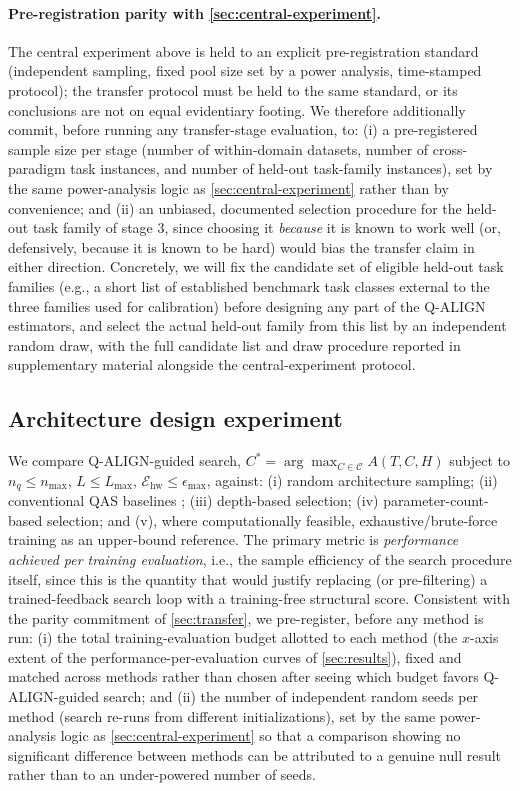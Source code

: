 \documentclass[11pt]{article}
\begin{document}
\paragraph{Pre-registration parity with \cref{sec:central-experiment}.} The central experiment above is held to an explicit pre-registration standard (independent sampling, fixed pool size set by a power analysis, time-stamped protocol); the transfer protocol must be held to the same standard, or its conclusions are not on equal evidentiary footing. We therefore additionally commit, before running any transfer-stage evaluation, to: (i) a pre-registered sample size per stage (number of within-domain datasets, number of cross-paradigm task instances, and number of held-out task-family instances), set by the same power-analysis logic as \cref{sec:central-experiment} rather than by convenience; and (ii) an unbiased, documented selection procedure for the held-out task family of stage 3, since choosing it \emph{because} it is known to work well (or, defensively, because it is known to be hard) would bias the transfer claim in either direction. Concretely, we will fix the candidate set of eligible held-out task families (e.g., a short list of established benchmark task classes external to the three families used for calibration) before designing any part of the Q-ALIGN estimators, and select the actual held-out family from this list by an independent random draw, with the full candidate list and draw procedure reported in supplementary material alongside the central-experiment protocol.

\subsection{Architecture design experiment}
We compare Q-ALIGN-guided search, $C^\ast = \arg\max_{C\in\mathcal{C}} A(T,C,H)$ subject to $n_q \le n_{\max}$, $L \le L_{\max}$, $\mathcal{E}_{\mathrm{hw}} \le \epsilon_{\max}$, against: (i) random architecture sampling; (ii) conventional QAS baselines \citep{du2022quantum,zhang2022differentiable,ostaszewski2021reinforcement}; (iii) depth-based selection; (iv) parameter-count-based selection; and (v), where computationally feasible, exhaustive/brute-force training as an upper-bound reference. The primary metric is \emph{performance achieved per training evaluation}, i.e., the sample efficiency of the search procedure itself, since this is the quantity that would justify replacing (or pre-filtering) a trained-feedback search loop with a training-free structural score. Consistent with the parity commitment of \cref{sec:transfer}, we pre-register, before any method is run: (i) the total training-evaluation budget allotted to each method (the $x$-axis extent of the performance-per-evaluation curves of \cref{sec:results}), fixed and matched across methods rather than chosen after seeing which budget favors Q-ALIGN-guided search; and (ii) the number of independent random seeds per method (search re-runs from different initializations), set by the same power-analysis logic as \cref{sec:central-experiment} so that a comparison showing no significant difference between methods can be attributed to a genuine null result rather than to an under-powered number of seeds.
\end{document}
